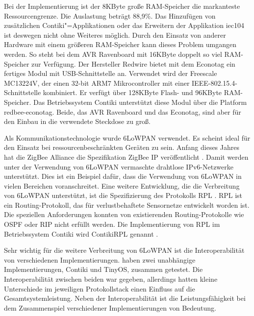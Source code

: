 Bei der Implementierung ist der 8KByte große RAM-Speicher die markanteste Ressourcengrenze. Die Auslastung beträgt 88,9\%. Das Hinzufügen von zusätzlichen Contiki"=Applikationen oder das Erweitern der Applikation iec104 ist deswegen nicht ohne Weiteres möglich. Durch den Einsatz von anderer Hardware mit einem größeren RAM-Speicher kann dieses Problem umgangen werden. So steht bei dem AVR Ravenboard mit 16KByte doppelt so viel RAM-Speicher zur Verfügung. Der Hersteller Redwire bietet mit dem Econotag ein fertiges Modul mit USB-Schnittstelle an. Verwendet wird der Freescale MC13224V, der einen 32-bit ARM7 Mikrocontroller mit einer IEEE-802.15.4-Schnittstelle kombiniert. Er verfügt über 128KByte Flash- und 96KByte RAM-Speicher. Das Betriebssystem Contiki unterstützt diese Modul über die Platform redbee-econotag. Beide, das AVR Ravenboard und das Econotag, sind aber für den Einbau in die verwendete Steckdose zu groß.


Als Kommunikationstechnologie wurde 6LoWPAN verwendet. Es scheint ideal für den Einsatz bei ressourcenbeschränkten Geräten zu sein. Anfang dieses Jahres hat die ZigBee Alliance die Spezifikation ZigBee IP veröffentlicht \citep{zigbee-ip}. Damit werden unter der Verwendung von 6LoWPAN vermaschte drahtlose IPv6-Netzwerke unterstützt. Dies ist ein Beispiel dafür, dass die Verwendung von 6LoWPAN in vielen Bereichen voranschreitet. Eine weitere Entwicklung, die die Verbreitung von 6LoWPAN unterstützt, ist die Spezifizierung des Protokolls RPL \citep{RFC6550}. RPL ist ein Routing-Protokoll, das für verlustbehaftete Sensornetze entwickelt worden ist. Die speziellen Anforderungen konnten von existierenden Routing-Protokolle wie OSPF oder RIP nicht erfüllt werden. Die Implementierung von RPL im Betriebssystem Contiki wird ContikiRPL genannt \citep{tsiftes10rpl}.

Sehr wichtig für die weitere Verbreitung von 6LoWPAN ist die Interoperabilität von verschiedenen Implementierungen. \textcite{ko11beyond} haben zwei unabhängige Implementierungen, Contiki und TinyOS, zusammen getestet. Die Interoperabilität zwischen beiden war gegeben, allerdings hatten kleine Unterschiede im jeweiligen Protokollstack einen Einfluss auf die Gesamtsystemleistung. Neben der Interoperabilität ist die Leistungsfähigkeit bei dem Zusammenspiel verschiedener Implementierungen von Bedeutung.

